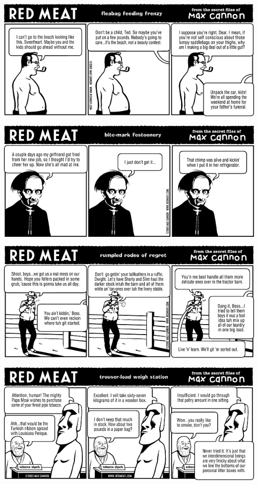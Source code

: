 \documentclass[a4paper,twoside,11pt]{article}
\begin{document}
\includegraphics[width=\textwidth]{redmeat_2005-11-22.png}



\includegraphics[width=\textwidth]{redmeat_2005-11-29.png}



\includegraphics[width=\textwidth]{redmeat_2005-12-06.png}



\includegraphics[width=\textwidth]{redmeat_2005-12-13.png}
\end{document}
